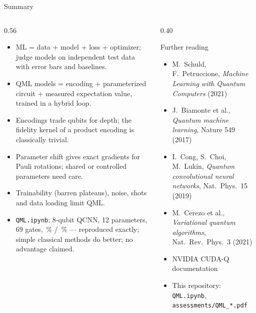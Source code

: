 \documentclass[aspectratio=169,11pt]{beamer}
\begin{document}
\begin{frame}{Summary}
  \begin{columns}[T]
    \begin{column}{0.56\textwidth}
      \footnotesize
      \begin{itemize}\itemsep1pt
        \item ML = data + model + loss + optimizer; judge models on independent test data with error bars and baselines.
        \item QML models = encoding + parameterized circuit + measured expectation value, trained in a hybrid loop.
        \item Encodings trade qubits for depth; the fidelity kernel of a product encoding is classically trivial.
        \item Parameter shift gives exact gradients for Pauli rotations; shared or controlled parameters need care.
        \item Trainability (barren plateaus), noise, shots and data loading limit QML.
        \item \texttt{QML.ipynb}: 8-qubit QCNN, 12 parameters, 69 gates, \numtrainacc\,\% / \numtestacc\,\% --- reproduced exactly; simple classical
          methods do better; no advantage claimed.
      \end{itemize}
    \end{column}
    \begin{column}{0.40\textwidth}
      \begin{block}{Further reading}
        \scriptsize
        \begin{itemize}\itemsep0pt
          \item M.\ Schuld, F.\ Petruccione, \emph{Machine Learning with Quantum Computers} (2021)
          \item J.\ Biamonte et al., \emph{Quantum machine learning}, Nature 549 (2017)
          \item I.\ Cong, S.\ Choi, M.\ Lukin, \emph{Quantum convolutional neural networks}, Nat.\ Phys.\ 15 (2019)
          \item M.\ Cerezo et al., \emph{Variational quantum algorithms}, Nat.\ Rev.\ Phys.\ 3 (2021)
          \item NVIDIA CUDA-Q documentation
          \item This repository: \texttt{QML.ipynb}, \texttt{assessments/QML\_*.pdf}
        \end{itemize}
      \end{block}
    \end{column}
  \end{columns}
\end{frame}
\end{document}
